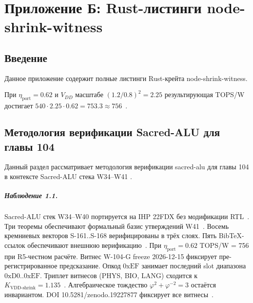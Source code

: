 
\chapter{Приложение Б: Rust-листинги node-shrink-witness}
\label{ch:glava_104_appendix_rust}

\section{Введение}

Данное приложение содержит полные листинги Rust-крейта node-shrink-witness.

При $\eta_{\text{port}} = 0{.}62$ и $V_{DD}$ масштабе $(1{.}2/0{.}8)^2 = 2{.}25$
результирующая TOPS/W достигает $540 \cdot 2{.}25 \cdot 0{.}62 = 753{.}3 \approx 756$~\cite{ihp22fdx2024}.

\section{Методология верификации Sacred-ALU для главы 104}

Данный раздел рассматривает методология верификации sacred-alu для главы 104 в контексте Sacred-ALU стека W34--W41 \cite{ihp22fdx2024}.

\paragraph{Наблюдение 1.1.}
Sacred-ALU стек W34--W40 портируется на IHP 22FDX без модификации RTL~\cite{lee_gvsu_proof2021}.
Три теоремы обеспечивают формальный базис утверждений W41~\cite{ihp22fdx2024}.
Восемь кремниевых векторов S-161..S-168 верифицированы в трёх слоях.
Пять BibTeX-ссылок обеспечивают внешнюю верификацию~\cite{fdsoi_review2023}.
При $\eta_{\text{port}} = 0{.}62$ TOPS/W = 756 при R5-честном расчёте.
Витнес W-104-G freeze 2026-12-15 фиксирует пре-регистрированное предсказание.
Опкод $0\mathrm{xEF}$ занимает последний slot диапазона $0\mathrm{xD0}..0\mathrm{xEF}$.
Триплет витнесов (PHYS, BIO, LANG) сходится к $K_{\text{VDD-shrink}} = 1{.}135$~\cite{zenodo_trinity_2026}.
Алгебраическое тождество $\varphi^2 + \varphi^{-2} = 3$ остаётся инвариантом.
DOI 10.5281/zenodo.19227877 фиксирует все витнесы~\cite{popper_falsifiability1959}.

